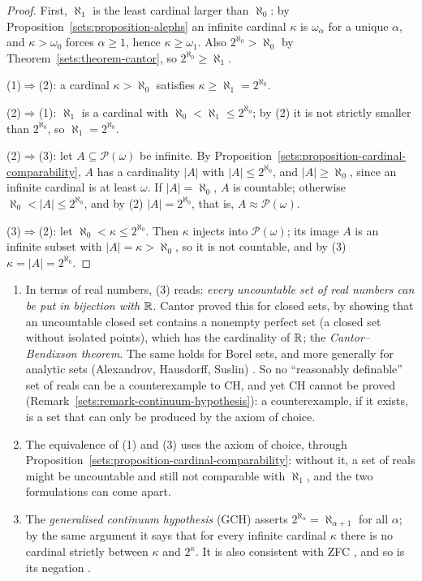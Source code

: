 \begin{proof}
First, $\aleph_1$ is the least cardinal larger than $\aleph_0$: by Proposition~\ref{sets:proposition-alephs} an infinite cardinal $\kappa$ is $\omega_\alpha$ for a unique $\alpha$, and
$\kappa > \omega_0$ forces $\alpha \geq 1$, hence $\kappa \geq \omega_1$. Also $2^{\aleph_0} > \aleph_0$ by Theorem~\ref{sets:theorem-cantor}, so $2^{\aleph_0} \geq \aleph_1$.

(1)$\Rightarrow$(2): a cardinal $\kappa > \aleph_0$ satisfies $\kappa \geq \aleph_1 = 2^{\aleph_0}$.

(2)$\Rightarrow$(1): $\aleph_1$ is a cardinal with $\aleph_0 < \aleph_1 \leq 2^{\aleph_0}$; by (2) it is not strictly smaller than $2^{\aleph_0}$, so $\aleph_1 = 2^{\aleph_0}$.

(2)$\Rightarrow$(3): let $A \subseteq \mathcal{P}(\omega)$ be infinite. By Proposition~\ref{sets:proposition-cardinal-comparability}, $A$ has a cardinality $|A|$ with $|A| \leq 2^{\aleph_0}$, and
$|A| \geq \aleph_0$, since an infinite cardinal is at least $\omega$. If $|A| = \aleph_0$, $A$ is countable; otherwise $\aleph_0 < |A| \leq 2^{\aleph_0}$, and by (2) $|A| = 2^{\aleph_0}$, that is,
$A \approx \mathcal{P}(\omega)$.

(3)$\Rightarrow$(2): let $\aleph_0 < \kappa \leq 2^{\aleph_0}$. Then $\kappa$ injects into $\mathcal{P}(\omega)$; its image $A$ is an infinite subset with $|A| = \kappa > \aleph_0$, so it is not countable,
and by (3) $\kappa = |A| = 2^{\aleph_0}$.
\end{proof}

\begin{remark}\label{sets:remark-continuum-hypothesis-sets}
\begin{enumerate}
\item In terms of real numbers, (3) reads: \emph{every uncountable set of real numbers can be put in bijection with $\mathbb{R}$}. Cantor proved this for closed sets, by showing that an uncountable closed set
contains a nonempty perfect set (a closed set without isolated points), which has the cardinality of $\mathbb{R}$; the \emph{Cantor--Bendixson theorem}. The same holds for Borel sets, and more generally for
analytic sets (Alexandrov, Hausdorff, Suslin) \cite{jech-set-theory}. So no ``reasonably definable'' set of reals can be a counterexample to CH, and yet CH cannot be proved
(Remark~\ref{sets:remark-continuum-hypothesis}): a counterexample, if it exists, is a set that can only be produced by the axiom of choice.
\item The equivalence of (1) and (3) uses the axiom of choice, through Proposition~\ref{sets:proposition-cardinal-comparability}: without it, a set of reals might be uncountable and still not comparable
with $\aleph_1$, and the two formulations can come apart.
\item The \emph{generalised continuum hypothesis} (GCH) asserts $2^{\aleph_\alpha} = \aleph_{\alpha + 1}$ for all $\alpha$; by the same argument it says that for every infinite cardinal $\kappa$ there is no
cardinal strictly between $\kappa$ and $2^\kappa$. It is also consistent with ZFC \cite{godel-1938}, and so is its negation \cite{cohen-1963}.
\end{enumerate}
\end{remark}

